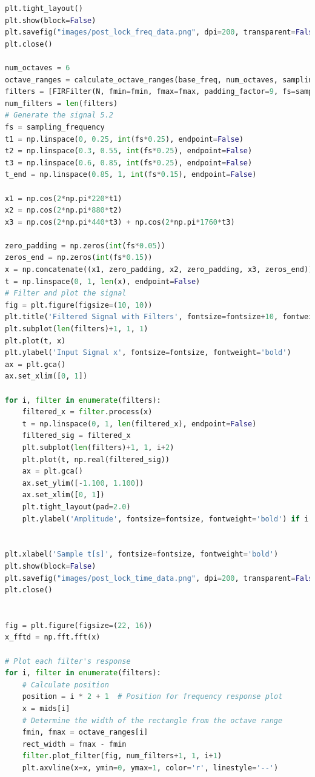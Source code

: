 \documentclass[a4paper, 11pt]{exam}
\begin{document}
\begin{lstlisting}[language=Python]
plt.tight_layout()
plt.show(block=False)
plt.savefig("images/post_lock_freq_data.png", dpi=200, transparent=False)
plt.close()

num_octaves = 6
octave_ranges = calculate_octave_ranges(base_freq, num_octaves, sampling_frequency, N)
filters = [FIRFilter(N, fmin=fmin, fmax=fmax, padding_factor=9, fs=sampling_frequency) for fmin, fmax in octave_ranges]
num_filters = len(filters)
# Generate the signal 5.2
fs = sampling_frequency
t1 = np.linspace(0, 0.25, int(fs*0.25), endpoint=False)
t2 = np.linspace(0.3, 0.55, int(fs*0.25), endpoint=False)
t3 = np.linspace(0.6, 0.85, int(fs*0.25), endpoint=False)
t_end = np.linspace(0.85, 1, int(fs*0.15), endpoint=False)

x1 = np.cos(2*np.pi*220*t1)
x2 = np.cos(2*np.pi*880*t2)
x3 = np.cos(2*np.pi*440*t3) + np.cos(2*np.pi*1760*t3)

zero_padding = np.zeros(int(fs*0.05))
zeros_end = np.zeros(int(fs*0.15))
x = np.concatenate((x1, zero_padding, x2, zero_padding, x3, zeros_end))
t = np.linspace(0, 1, len(x), endpoint=False)
# Filter and plot the signal
fig = plt.figure(figsize=(10, 10))
plt.title('Filtered Signal with Filters', fontsize=fontsize+10, fontweight='bold')
plt.subplot(len(filters)+1, 1, 1)
plt.plot(t, x)
plt.ylabel('Input Signal x', fontsize=fontsize, fontweight='bold')
ax = plt.gca()
ax.set_xlim([0, 1])

for i, filter in enumerate(filters):
    filtered_x = filter.process(x)
    t = np.linspace(0, 1, len(filtered_x), endpoint=False)
    filtered_sig = filtered_x
    plt.subplot(len(filters)+1, 1, i+2)
    plt.plot(t, np.real(filtered_sig))
    ax = plt.gca()
    ax.set_ylim([-1.100, 1.100])
    ax.set_xlim([0, 1])
    plt.tight_layout(pad=2.0)
    plt.ylabel('Amplitude', fontsize=fontsize, fontweight='bold') if i == (len(filters)//2) else None


plt.xlabel('Sample t[s]', fontsize=fontsize, fontweight='bold')
plt.show(block=False)
plt.savefig("images/post_lock_time_data.png", dpi=200, transparent=False)
plt.close()


fig = plt.figure(figsize=(22, 16))
x_fftd = np.fft.fft(x)

# Plot each filter's response
for i, filter in enumerate(filters):
    # Calculate position
    position = i * 2 + 1  # Position for frequency response plot
    x = mids[i]
    # Determine the width of the rectangle from the octave range
    fmin, fmax = octave_ranges[i]
    rect_width = fmax - fmin
    filter.plot_filter(fig, num_filters+1, 1, i+1)
    plt.axvline(x=x, ymin=0, ymax=1, color='r', linestyle='--')
    

\end{lstlisting}
\end{document}
